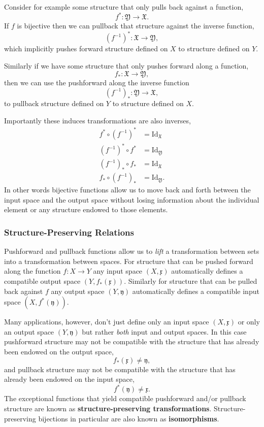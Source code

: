 \documentclass[
  letterpaper,
  DIV=11,
  numbers=noendperiod]{scrartcl}
\begin{document}
Consider for example some structure that only pulls back against a
function, \[
f^{*} : \mathfrak{Y} \rightarrow \mathfrak{X}.
\] If \(f\) is bijective then we can pullback that structure against the
inverse function, \[
(f^{-1})^{*} : \mathfrak{X} \rightarrow \mathfrak{Y},
\] which implicitly pushes forward structure defined on \(X\) to
structure defined on \(Y\).

Similarly if we have some structure that only pushes forward along a
function, \[
f_{*} : \mathfrak{X} \rightarrow \mathfrak{Y},
\] then we can use the pushforward along the inverse function \[
(f^{-1})_{*} : \mathfrak{Y} \rightarrow \mathfrak{X},
\] to pullback structure defined on \(Y\) to structure defined on \(X\).

Importantly these induces transformations are also inverses,
\begin{align*}
f^{*} \circ (f^{-1})^{*} &= \mathrm{Id}_{\mathfrak{X}}
\\
(f^{-1})^{*} \circ f^{*} &= \mathrm{Id}_{\mathfrak{Y}}
\\
(f^{-1})_{*} \circ f_{*} &= \mathrm{Id}_{\mathfrak{X}}
\\
f_{*} \circ (f^{-1})_{*} &= \mathrm{Id}_{\mathfrak{Y}}.
\end{align*} In other words bijective functions allow us to move back
and forth between the input space and the output space without losing
information about the individual element or any structure endowed to
those elements.

\hypertarget{structure-preserving-relations}{%
\subsubsection{Structure-Preserving
Relations}\label{structure-preserving-relations}}

Pushforward and pullback functions allow us to \emph{lift} a
transformation between sets into a transformation between spaces. For
structure that can be pushed forward along the function
\(f : X \rightarrow Y\) any input space \((X, \mathfrak{x})\)
automatically defines a compatible output space
\((Y, f_{*}(\mathfrak{x}))\). Similarly for structure that can be pulled
back against \(f\) any output space \((Y, \mathfrak{y})\) automatically
defines a compatible input space \((X, f^{*}(\mathfrak{y}))\).

Many applications, however, don't just define only an input space
\((X, \mathfrak{x})\) or only an output space \((Y, \mathfrak{y})\) but
rather \emph{both} input and output spaces. In this case pushforward
structure may not be compatible with the structure that has already been
endowed on the output space, \[
f_{*}(\mathfrak{x}) \ne \mathfrak{y},
\] and pullback structure may not be compatible with the structure that
has already been endowed on the input space, \[
f^{*}(\mathfrak{y}) \ne \mathfrak{x}.
\] The exceptional functions that yield compatible pushforward and/or
pullback structure are known as \textbf{structure-preserving
transformations}. Structure-preserving bijections in particular are also
known as \textbf{isomorphisms}.
\end{document}
